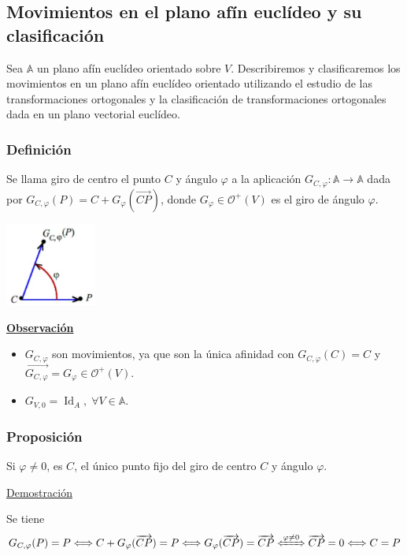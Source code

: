 \documentclass[12pt, a4paper, ones, notitlepage, openany,titlepage]{article}
\newcommand{\demostracion}{\noindent\underline{Demostración}}
\newcommand{\observacion}{\noindent\underline{\textbf{Observación}}}
\begin{document}
\subsection{Movimientos en el plano afín euclídeo y su clasificación}
Sea $\mathbb{A}$ un plano afín euclídeo orientado sobre $V$. Describiremos y clasificaremos los movimientos en un plano afín euclídeo orientado utilizando el estudio de las transformaciones ortogonales y la clasificación de transformaciones ortogonales dada en un plano vectorial euclídeo.

\subsubsection{Definición}
Se llama giro de centro el punto $C$ y ángulo $\varphi$ a la aplicación $G_{C, \varphi}: \mathbb{A} \rightarrow \mathbb{A}$ dada por $G_{C, \varphi}(P)=C+G_{\varphi}(\overrightarrow{C P})$, donde $G_{\varphi} \in \mathcal{O}^{+}(V)$ es el giro de ángulo $\varphi$.
\begin{center}
	\includegraphics[max width=3cm]{2023_04_25_301d1803eaf1bc74cfd9g-080(1)}
\end{center}
\observacion
\begin{itemize}
\item $G_{C, \varphi}$ son movimientos, ya que son la única afinidad con $G_{C, \varphi}(C) = C$ y $\vec{G_{C, \varphi}} = G_\varphi \in \mathcal{O}^+(V)$.
\item $G_{V,0} = \operatorname{Id}_A, \; \forall V \in \mathbb{A}$.
\end{itemize}

\subsubsection{Proposición}
\noindent Si $\varphi \neq 0$, es $C$, el único punto fijo del giro de centro $C$ y ángulo $\varphi$.

\demostracion

Se tiene
$$
G_{C, \varphi}(P)=P \Longleftrightarrow C+G_{\varphi}(\overrightarrow{C P})=P \Longleftrightarrow G_{\varphi}(\overrightarrow{C P})=\overrightarrow{C P} \xLeftrightarrow{\varphi \neq 0} \overrightarrow{C P}=0 \Longleftrightarrow C=P
$$
\end{document}
